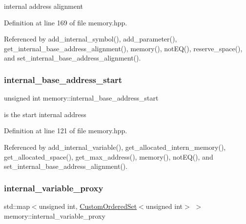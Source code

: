 internal address alignment 



Definition at line 169 of file memory.\+hpp.



Referenced by add\+\_\+internal\+\_\+symbol(), add\+\_\+parameter(), get\+\_\+internal\+\_\+base\+\_\+address\+\_\+alignment(), memory(), not\+E\+Q(), reserve\+\_\+space(), and set\+\_\+internal\+\_\+base\+\_\+address\+\_\+alignment().

\mbox{\label{classmemory_ac55060cc8c48960f050d7c1a08b31d52}} 
\subsubsection{\texorpdfstring{internal\+\_\+base\+\_\+address\+\_\+start}{internal\_base\_address\_start}}
{\footnotesize\ttfamily unsigned int memory\+::internal\+\_\+base\+\_\+address\+\_\+start\hspace{0.3cm}{\ttfamily [private]}}



is the start internal address 



Definition at line 121 of file memory.\+hpp.



Referenced by add\+\_\+internal\+\_\+variable(), get\+\_\+allocated\+\_\+intern\+\_\+memory(), get\+\_\+allocated\+\_\+space(), get\+\_\+max\+\_\+address(), memory(), not\+E\+Q(), and set\+\_\+internal\+\_\+base\+\_\+address\+\_\+alignment().

\mbox{\label{classmemory_a45fb0aa269feeca220af83356be42e11}} 
\subsubsection{\texorpdfstring{internal\+\_\+variable\+\_\+proxy}{internal\_variable\_proxy}}
{\footnotesize\ttfamily std\+::map$<$unsigned int, \hyperlink{classCustomOrderedSet}{Custom\+Ordered\+Set}$<$unsigned int$>$ $>$ memory\+::internal\+\_\+variable\+\_\+proxy\hspace{0.3cm}{\ttfamily [private]}}



